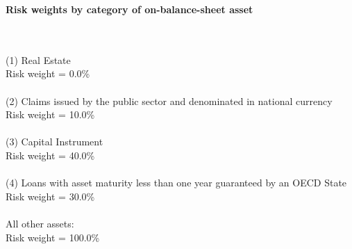 \documentclass{article}
\begin{document}
\setlength{\parindent}{0em}
\begin{center}{\bf Risk weights by category of on-balance-sheet asset}\end{center}
~\\
~\\

(1) Real Estate\\
Risk weight = 0.0\%\\

~\\
(2) Claims issued by the public sector and denominated in national currency \\
Risk weight = 10.0\%\\

~\\
(3) Capital Instrument \\
Risk weight = 40.0\%\\

~\\
(4) Loans with asset maturity less than one year guaranteed by an OECD State \\
Risk weight = 30.0\%\\

~\\
All other assets:\\
Risk weight = 100.0\%\\

~\\
\end{document}
